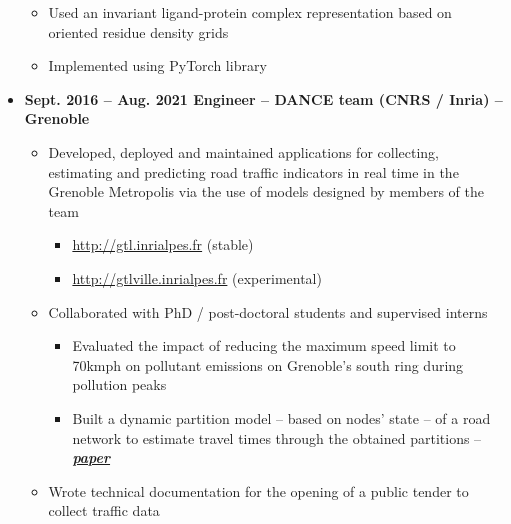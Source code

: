 \documentclass{article}
\begin{document}
\begin{minipage}{0.8\textwidth}
\begin{flushleft}
\begin{itemize}
\begin{itemize}[leftmargin=*]
            \item Used an invariant ligand-protein complex representation based on oriented residue density grids
            \item Implemented using PyTorch library
        \end{itemize}
        \item \textbf{Sept. 2016 – Aug. 2021 \qquad Engineer – DANCE team (CNRS / Inria) – Grenoble}
        \vspace{-.15cm}
        \begin{itemize}[leftmargin=*]
        \setlength\itemsep{.01cm}
            \item Developed, deployed and maintained applications for collecting, estimating and predicting road traffic indicators in real time in the Grenoble Metropolis via the use of models designed by members of the team
            \vspace{-.15cm}
            \begin{itemize}[leftmargin=*]
            \setlength\itemsep{.01cm}
                \item \url{http://gtl.inrialpes.fr} (stable)
                \item \url{http://gtlville.inrialpes.fr} (experimental)
            \end{itemize}
            \item Collaborated with PhD / post-doctoral students and supervised interns
                \vspace{-.15cm}
                \begin{itemize}[leftmargin=*]
                \setlength\itemsep{.01cm}
                    \item Evaluated the impact of reducing the maximum speed limit to 70kmph on pollutant emissions on Grenoble’s south ring during pollution peaks
                    \item Built a dynamic partition model – based on nodes’ state – of a road network to estimate travel times through the obtained partitions – \textbf{\textit{\hyperlink{https://hal.archives-ouvertes.fr/hal-01953560}{paper}}}
                \end{itemize}
            \item Wrote technical documentation for the opening of a public tender to collect traffic data
        \end{itemize}
    \end{itemize}
\end{flushleft}
\end{minipage}
\end{document}
